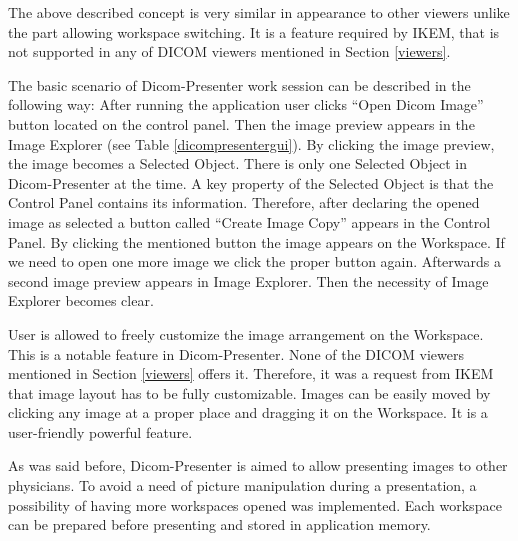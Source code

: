 The above described concept is very similar in appearance to other viewers unlike the part allowing workspace switching. It is a feature required by IKEM, that is not supported in any of DICOM viewers mentioned in Section \ref{viewers}.

The basic scenario of Dicom-Presenter work session can be described in the following way: After running the application user clicks ``Open Dicom Image'' button located on the control panel. Then the image preview appears in the Image Explorer (see Table \ref{dicompresentergui}). By clicking the image preview, the image becomes a Selected Object. There is only one Selected Object in Dicom-Presenter at the time. A key property of the Selected Object is that the Control Panel contains its information. Therefore, after declaring the opened image as selected a button called ``Create Image Copy'' appears in the Control Panel. By clicking the mentioned button the image appears on the Workspace. If we need to open one more image we click the proper button again. Afterwards a second image preview appears in Image Explorer. Then the necessity of Image Explorer becomes clear.

User is allowed to freely customize the image arrangement on the Workspace. This is a notable feature in Dicom-Presenter. None of the DICOM viewers mentioned in Section \ref{viewers} offers it. Therefore, it was a request from IKEM that image layout has to be fully customizable. Images can be easily moved  by clicking any image at a proper place and dragging it on the Workspace.  It is a user-friendly powerful feature.

As was said before, Dicom-Presenter is aimed to allow presenting images to other physicians. To avoid a need of picture manipulation during a presentation, a possibility of having more workspaces opened was implemented. Each workspace can be prepared before presenting and stored in application memory.
 
